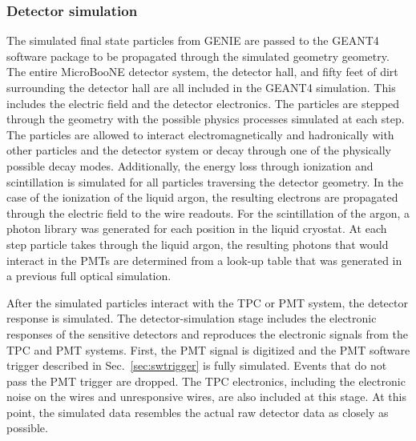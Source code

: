   \subsubsection{Detector simulation}
    The simulated final state particles from GENIE are passed to the
    GEANT4~\cite{geant4} software package to be propagated through the
    simulated geometry geometry. The entire MicroBooNE detector system, the
    detector hall, and fifty feet of dirt surrounding the detector hall are all
    included in the GEANT4 simulation. This includes the electric field and the
    detector electronics. The particles are stepped through the geometry with
    the possible physics processes simulated at each step. The particles are
    allowed to interact electromagnetically and hadronically with other
    particles and the detector system or decay through one of the physically
    possible decay modes. Additionally, the energy loss through ionization and
    scintillation is simulated for all particles traversing the detector
    geometry. In the case of the ionization of the liquid argon, the resulting
    electrons are propagated through the electric field to the wire readouts.
    For the scintillation of the argon, a photon library was generated for each
    position in the liquid cryostat. At each step particle takes through the
    liquid argon, the resulting photons that would interact in the PMTs are
    determined from a look-up table that was generated in a previous full
    optical simulation. 

    After the simulated particles interact with the TPC or PMT system, the
    detector response is simulated. The detector-simulation stage includes the
    electronic responses of the sensitive detectors and reproduces the
    electronic signals from the TPC and PMT systems. First, the PMT signal is
    digitized and the PMT software trigger described in
    Sec.~\ref{sec:swtrigger} is fully simulated. Events that do not pass the
    PMT trigger are dropped. The TPC electronics, including the electronic
    noise on the wires and unresponsive wires, are also included at this stage.
    At this point, the simulated data resembles the actual raw detector data as
    closely as possible.

